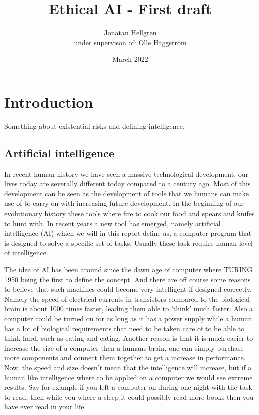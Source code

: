 \documentclass[12pt,A4]{report}
\title{Ethical AI - First draft}
\author{Jonatan Hellgren\\
under supervison of: Olle Häggström}
\date{March 2022}
\theoremstyle{definition}
\begin{document}
\maketitle


\thispagestyle{empty}

\newpage
{}

\tableofcontents

\newpage
{}


\chapter{Introduction}
Something about existential risks and defining intelligence. 

\section{Artificial intelligence}

In recent human history we have seen a massive technological development, our lives today are severally different today compared to a century ago. Most of this development can be seen as the development of tools that we humans can make use of to carry on with increasing future development. In the beginning of our evolutionary history these tools where fire to cook our food and spears and knifes to hunt with. In recent years a new tool has emerged, namely artificial intelligence (AI) which we will in this report define as, a computer program that is designed to solve a specific set of tasks. Usually these task require human level of intelligence.

The idea of AI has been around since the dawn age of computer where TURING 1950 being the first to define the concept. And there are off course some reasons to believe that such machines could become very intelligent if designed correctly. Namely the speed of electrical currents in transistors compared to the biological brain is about 1000 times faster, leading them able to 'think' much faster. Also a computer could be turned on for as long as it has a power supply while a human has a lot of biological requirements that need to be taken care of to be able to think hard, such as eating and eating. Another reason is that it is much easier to increase the size of a computer then a humans brain, one can simply purchase more components and connect them together to get a increase in performance. Now, the speed and size doesn't mean that the intelligence will increase, but if a human like intelligence where to be applied on a computer we would see extreme results. Say for example if you left a computer on during one night with the task to read, then while you where a sleep it could possibly read more books then you have ever read in your life. 
\end{document}
